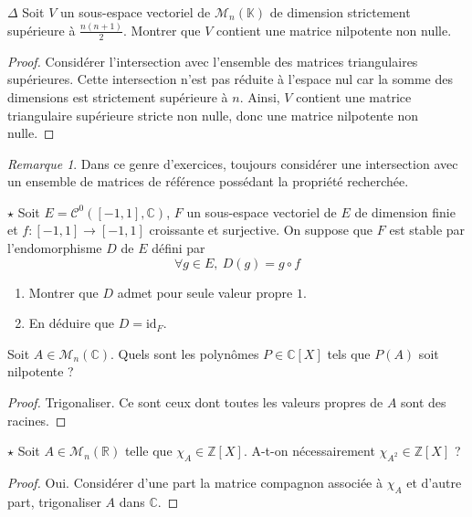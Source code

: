 \documentclass[french,a4paper]{article}
\newcommand{\Z}{\mathbb{Z}}
\newcommand{\R}{\mathbb{R}}
\newcommand{\C}{\mathbb{C}}
\newcommand{\K}{\mathbb{K}}
\theoremstyle{plain}
\theoremstyle{definition}
\theoremstyle{remark}
\newtheorem*{rmq}{Remarque}
\begin{document}
\begin{ex}{$\Delta$}
	Soit $V$ un sous-espace vectoriel de $\mathcal{M}_n(\K)$ de dimension strictement supérieure à $\displaystyle\frac{n(n+1)}{2}$. Montrer que $V$ contient une matrice nilpotente non nulle.
\end{ex}
\begin{proof}
	Considérer l'intersection avec l'ensemble des matrices triangulaires supérieures. Cette intersection n'est pas réduite à l'espace nul car la somme des dimensions est strictement supérieure à $n$. Ainsi, $V$ contient une matrice triangulaire supérieure stricte non nulle, donc une matrice nilpotente non nulle.
\end{proof}
\begin{rmq}
	Dans ce genre d'exercices, toujours considérer une intersection avec un ensemble de matrices de référence possédant la propriété recherchée.
\end{rmq}

\begin{ex}{$\star$}
	Soit $E=\mathcal{C}^0([-1,1],\C)$, $F$ un sous-espace vectoriel de $E$ de dimension finie et $f:[-1,1]\to[-1,1]$ croissante et surjective. On suppose que $F$ est stable par l'endomorphisme $D$ de $E$ défini par $$\forall g\in E,\ D(g)=g\circ f$$
	\begin{enumerate}
		\item Montrer que $D$ admet pour seule valeur propre $1$.
		\item En déduire que $D=\text{id}_F$.
	\end{enumerate}
\end{ex}

\begin{ex}{}
	Soit $A\in\mathcal{M}_n(\C)$. Quels sont les polynômes $P\in\C[X]$ tels que $P(A)$ soit nilpotente ?
\end{ex}
\begin{proof}
	Trigonaliser. Ce sont ceux dont toutes les valeurs propres de $A$ sont des racines.
\end{proof}

\begin{ex}[Guindy]{$\star$}
	Soit $A\in\mathcal{M}_n(\R)$ telle que $\chi_A\in\Z[X]$. A-t-on nécessairement $\chi_{A^2}\in\Z[X]$ ?
\end{ex}
\begin{proof}
	Oui. Considérer d'une part la matrice compagnon associée à $\chi_A$ et d'autre part, trigonaliser $A$ dans $\C$.
\end{proof}
\end{document}
